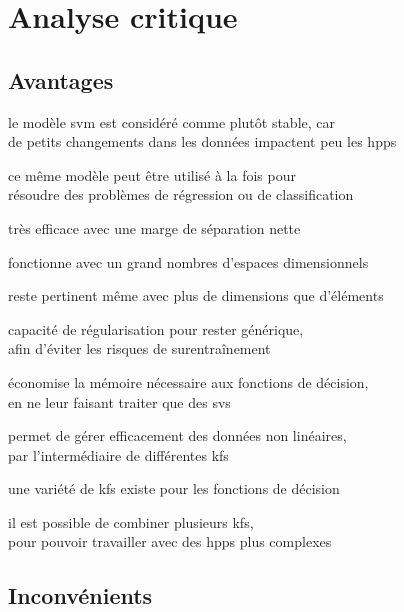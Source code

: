 \section{Analyse critique}

\subsection{Avantages}

\begin{itmz}
\item{le modèle \gls{svm} est considéré comme plutôt stable, car\\
de petits changements dans les données impactent peu les \glspl{hpp}}
\item{ce même modèle peut être utilisé à la fois pour\\
résoudre des problèmes de régression ou de classification}
\item{très efficace avec une marge de séparation nette}
\item{fonctionne avec un grand nombres d’espaces dimensionnels}
\item{reste pertinent même avec plus de dimensions que d’éléments}
\item{capacité de régularisation pour rester générique,\\
afin d’éviter les risques de surentraînement}
\item{économise la mémoire nécessaire aux fonctions de décision,\\
en ne leur faisant traiter que des \glspl{sv}}
\item{permet de gérer efficacement des données non linéaires,\\
par l’intermédiaire de différentes \glspl{kf}}
\item{une variété de \glspl{kf} existe pour les fonctions de décision}
\item{il est possible de combiner plusieurs \glspl{kf},\\
pour pouvoir travailler avec des \glspl{hpp} plus complexes}
\end{itmz}

\subsection{Inconvénients}

